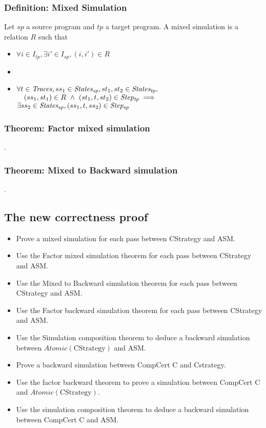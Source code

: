 \subsubsection{Definition: Mixed Simulation} Let $sp$ a source program and $tp$ a target program. A mixed simulation is a relation $R$ such that
\begin{itemize}
\item $\forall i\in I_{tp}, \exists i'\in I_{sp}, (i,i')\in R$
\item {}
\item $\forall t\in\mathit{Traces}, ss_1\in\mathit{States_{sp}},st_1,st_2\in\mathit{States_{tp}},$\\
      $\quad(ss_1,st_1)\in R~\wedge~(st_1,t,st_2)\in\mathit{Step_{tp}}\implies$\\
      $\exists ss_2\in\mathit{States_{sp}}, (ss_1,t,ss_2)\in\mathit{Step_{sp}}$
\end{itemize}

\subsubsection{Theorem: Factor mixed simulation}
.
\subsubsection{Theorem: Mixed to Backward simulation}
.

\subsection{The new correctness proof}
\begin{itemize}
\item Prove a mixed simulation for each pass between CStrategy and ASM.
\item Use the Factor mixed simulation theorem for each pass between CStrategy and ASM.
\item Use the Mixed to Backward simulation theorem for each pass between CStrategy and ASM.
\item Use the Factor backward simulation theorem for each pass between CStrategy and ASM.
\item Use the Simulation composition theorem to deduce a backward simulation between $\mathit{Atomic}(\text{CStrategy})$ and ASM.
\item Prove a backward simulation between CompCert C and Cstrategy.
\item Use the factor backward theorem to prove a simulation between CompCert C and $\mathit{Atomic}(\text{CStrategy})$.
\item Use the simulation composition theorem to deduce a backward simulation between CompCert C and ASM.
\end{itemize}
